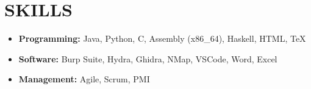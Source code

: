 \section*{SKILLS}
\begin{itemize}
    \item \textbf{Programming:} Java, Python, C, Assembly (x86\_64), Haskell, HTML, \TeX{}
    \item \textbf{Software:} Burp Suite, Hydra, Ghidra, NMap, VSCode, Word, Excel
    \item \textbf{Management:} Agile, Scrum, PMI
\end{itemize}